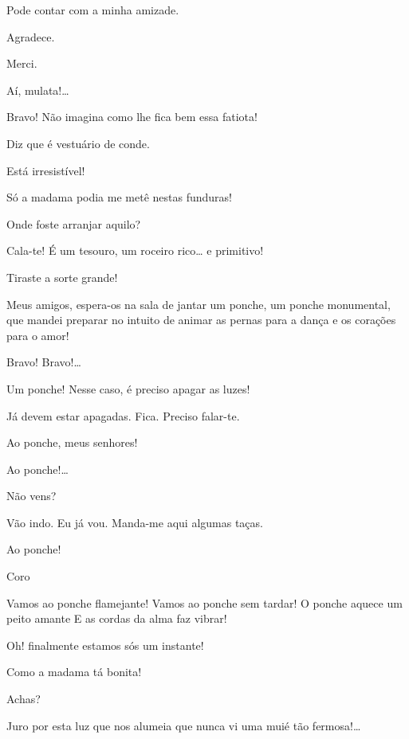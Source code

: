  Pode contar com a minha amizade.

 Agradece.

 Merci.

  Aí, mulata!\ldots{}

  Bravo! Não imagina como lhe fica bem essa fatiota!

 Diz que é vestuário de conde.

 Está irresistível!

 Só a madama podia me metê nestas funduras!

  Onde foste arranjar aquilo?

 Cala-te! É um tesouro, um roceiro rico\ldots{} e primitivo!

 Tiraste a sorte grande!

 Meus amigos, espera-os na sala de jantar um ponche, um ponche
monumental, que mandei preparar no intuito de animar as pernas para a dança
e os corações para o amor!

 Bravo! Bravo!\ldots{}

 Um ponche! Nesse caso, é preciso apagar as luzes!

 Já devem estar apagadas.  Fica. Preciso falar-te.

 Ao ponche, meus senhores!

 Ao ponche!\ldots{}

  Não vens?

 Vão indo. Eu já vou. Manda-me aqui algumas taças.

 Ao ponche!

 Coro

 Vamos ao ponche flamejante!
 Vamos ao ponche sem tardar!
 O ponche aquece um peito amante
 E as cordas da alma faz vibrar!

\repl{} 


 Oh! finalmente estamos sós um instante!

  Como a madama tá bonita!

 Achas?

 Juro por esta luz que nos alumeia que nunca vi uma muié tão
fermosa!\ldots{}

